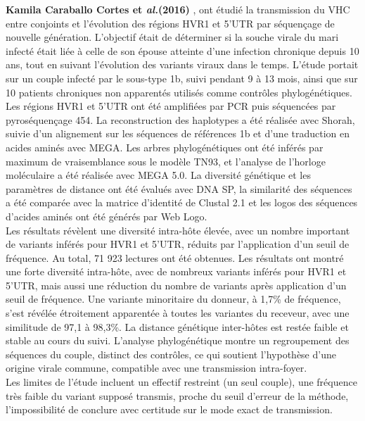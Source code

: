 \documentclass[a4paper,12pt]{article}
\begin{document}
 \textbf{Kamila Caraballo Cortes et \textit{al.}(2016)}  \cite{cortesSpousetoSpouseTransmissionEvolution2016}, ont étudié la transmission du VHC entre conjoints et l’évolution des régions HVR1 et 5'UTR par séquençage de nouvelle génération. L’objectif était de déterminer si la souche virale du mari infecté était liée à celle de son épouse atteinte d’une infection chronique depuis 10 ans, tout en suivant l’évolution des variants viraux dans le temps. L’étude portait sur un couple infecté par le sous-type 1b, suivi pendant 9 à 13 mois, ainsi que sur 10 patients chroniques non apparentés utilisés comme contrôles phylogénétiques. Les régions HVR1 et 5'UTR ont été amplifiées par PCR puis séquencées par pyroséquençage 454. La reconstruction des haplotypes a été réalisée avec Shorah, suivie d’un alignement sur les séquences de références 1b et d’une traduction en acides aminés avec MEGA. Les arbres phylogénétiques ont été inférés par maximum de vraisemblance sous le modèle TN93, et l’analyse de l’horloge moléculaire a été réalisée avec MEGA 5.0. La diversité génétique et les paramètres de distance ont été évalués avec DNA SP, la similarité des séquences a été comparée avec la matrice d'identité de Clustal 2.1 et les logos des séquences d'acides aminés ont été générés par Web Logo. \\
 Les résultats révèlent une diversité intra-hôte élevée, avec un nombre important de variants inférés pour HVR1 et 5'UTR, réduits par l’application d’un seuil de fréquence. Au total, 71 923 lectures ont été obtenues. Les résultats ont montré une forte diversité intra-hôte, avec de nombreux variants inférés pour HVR1 et 5'UTR, mais aussi une réduction du nombre de variants après application d’un seuil de fréquence. Une variante minoritaire du donneur, à 1,7\% de fréquence, s’est révélée étroitement apparentée à toutes les variantes du receveur, avec une similitude de 97,1 à 98,3\%. La distance génétique inter-hôtes est restée faible et stable au cours du suivi. L’analyse phylogénétique montre un regroupement des séquences du couple, distinct des contrôles, ce qui soutient l’hypothèse d’une origine virale commune, compatible avec une transmission intra-foyer. \\
Les limites de l’étude incluent un effectif restreint (un seul couple), une fréquence très faible du variant supposé transmis, proche du seuil d’erreur de la méthode, l’impossibilité de conclure avec certitude sur le mode exact de transmission. \\
\end{document}
